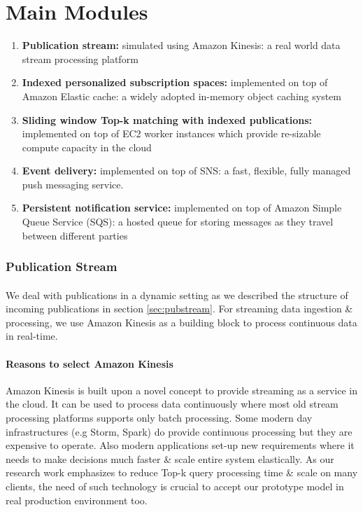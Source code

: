 \documentclass[a4paper,12pt,oneside]{book}
\theoremstyle{definition}
\theoremstyle{remark}
\begin{document}
\section{Main Modules}
\begin{enumerate}[label=$-$]
\item \textbf{Publication stream:} simulated using Amazon Kinesis: a real world data stream processing platform
\item \textbf{Indexed personalized subscription spaces:} implemented on top of Amazon Elastic cache: a widely adopted in-memory object caching system
\item \textbf{Sliding window Top-k matching with indexed publications:} implemented on top of \ac{EC2} worker instances which provide re-sizable compute capacity in the cloud
\item \textbf{Event delivery:} implemented on top of \ac{SNS}: a fast, flexible, fully managed push messaging service.
\item \textbf{Persistent notification service:} implemented on top of Amazon Simple Queue Service (SQS): a hosted queue for storing messages as they travel between different parties
\end{enumerate}


\subsubsection{Publication Stream}
\paragraph*{}
We deal with publications in a dynamic setting as we described the structure of incoming publications in section \ref{sec:pubstream}. For streaming data ingestion \& processing, we use Amazon Kinesis as a building block to process continuous data in real-time.

\paragraph*{Reasons to select Amazon Kinesis}
Amazon Kinesis is built upon a novel concept to provide streaming as a service in the cloud. It can be used to process data continuously where most old stream processing platforms supports only batch processing. Some modern day infrastructures (e.g Storm, Spark) do provide continuous processing but they are expensive to operate. Also modern applications set-up new requirements where it needs to make decisions much faster \& scale entire system elastically. As our research work emphasizes to reduce Top-k query processing time \& scale on many clients, the need of such technology is crucial to accept our prototype model in real production environment too.
\end{document}
